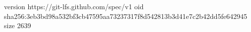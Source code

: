 version https://git-lfs.github.com/spec/v1
oid sha256:3eb3bd98a532bf3cb47595aa73237317f8d542813b3d41e7c2b42dd5fe642945
size 2639
